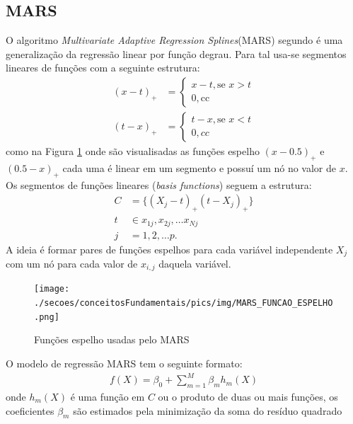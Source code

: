 \subsection{MARS}
O algoritmo \emph{Multivariate Adaptive Regression Splines}(MARS) segundo  é uma generalização da regressão linear por função degrau. Para tal usa-se segmentos lineares de funções com a seguinte estrutura:
\begin{align}
(x-t)_{+} &= \begin{cases}
x-t, \mbox{se } x>t \\
0,   \mbox{cc}
\end{cases}
\\
(t-x)_{+} &= \begin{cases}
t-x, \mbox{se } x<t \\
0, cc
\end{cases} 
\end{align}
como na Figura \ref{FIGURA_MARS_FUNCAO_ESPELHO} onde são visualisadas as funções espelho \((x-0.5)_{+}\) e \((0.5-x)_{+}\) cada uma é linear em um segmento e possuí um nó no valor de \(x\). Os segmentos de funções lineares (\emph{basis functions}) seguem a estrutura:
\begin{align}
C &= \{(X_{j}-t)_{+}(t-X_{j})_{+}\} \\
\nonumber t &\in {x_{1j}, x_{2j}, \ldots x_{Nj}}\\
\nonumber j &= 1, 2, \ldots p.
\end{align}
A ideia é formar pares de funções espelhos para cada variável independente \(X_{j}\) com um nó para cada valor de \(x_{i,j}\) daquela variável.
\begin{figure}[H]
	\centering
 	  \caption{Funções espelho usadas pelo MARS}
		\texttt{[image: ./secoes/conceitosFundamentais/pics/img/MARS\_FUNCAO\_ESPELHO.png]}
	\label{FIGURA_MARS_FUNCAO_ESPELHO}
\end{figure}
O modelo de regressão MARS tem o seguinte formato:
\begin{align}
f(X) = \beta_{0} + \sum\limits_{m=1}^{M}\beta_{m}h_{m}(X)
\end{align}
onde \(h_{m}(X)\) é uma função em \(C\) ou o produto de duas ou mais funções, os coeficientes \(\beta_{m}\) são estimados pela minimização da soma do resíduo quadrado

